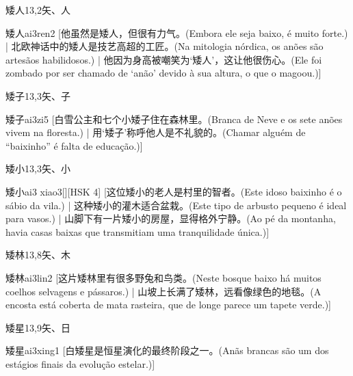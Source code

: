 \begin{entry}{矮人}{13,2}{⽮、⼈}
  \begin{phonetics}{矮人}{ai3ren2}
    [他虽然是矮人，但很有力气。(Embora ele seja baixo, é muito forte.) | 北欧神话中的矮人是技艺高超的工匠。(Na mitologia nórdica, os anões são artesãos habilidosos.) | 他因为身高被嘲笑为‘矮人’，这让他很伤心。(Ele foi zombado por ser chamado de ‘anão’ devido à sua altura, o que o magoou.)]
  \end{phonetics}
\end{entry}

\begin{entry}{矮子}{13,3}{⽮、⼦}
  \begin{phonetics}{矮子}{ai3zi5}
    [白雪公主和七个小矮子住在森林里。(Branca de Neve e os sete anões vivem na floresta.) | 用`矮子'称呼他人是不礼貌的。(Chamar alguém de ``baixinho'' é falta de educação.)]
  \end{phonetics}
\end{entry}

\begin{entry}{矮小}{13,3}{⽮、⼩}
  \begin{phonetics}{矮小}{ai3 xiao3}[][HSK 4]
    [这位矮小的老人是村里的智者。(Este idoso baixinho é o sábio da vila.) | 这种矮小的灌木适合盆栽。(Este tipo de arbusto pequeno é ideal para vasos.) | 山脚下有一片矮小的房屋，显得格外宁静。(Ao pé da montanha, havia casas baixas que transmitiam uma tranquilidade única.)]
  \end{phonetics}
\end{entry}

\begin{entry}{矮林}{13,8}{⽮、⽊}
  \begin{phonetics}{矮林}{ai3lin2}
    [这片矮林里有很多野兔和鸟类。(Neste bosque baixo há muitos coelhos selvagens e pássaros.) | 山坡上长满了矮林，远看像绿色的地毯。(A encosta está coberta de mata rasteira, que de longe parece um tapete verde.)]
  \end{phonetics}
\end{entry}

\begin{entry}{矮星}{13,9}{⽮、⽇}
  \begin{phonetics}{矮星}{ai3xing1}
    [白矮星是恒星演化的最终阶段之一。(Anãs brancas são um dos estágios finais da evolução estelar.)]
  \end{phonetics}
\end{entry}

